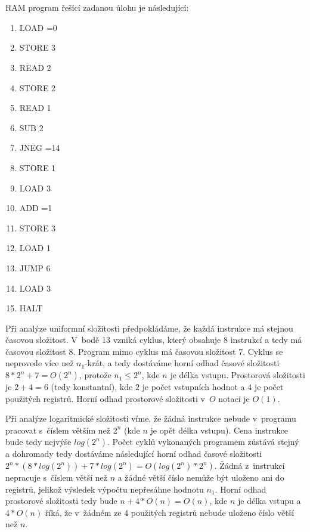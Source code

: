 \documentclass[a4paper]{article}
\begin{document}
\section*{}
RAM program řešící zadanou úlohu je následující:
\begin{enumerate}
    \item LOAD =0
    \item STORE 3
    \item READ 2
    \item STORE 2
    \item READ 1
    \item SUB 2
    \item JNEG =14
    \item STORE 1
    \item LOAD 3
    \item ADD =1
    \item STORE 3
    \item LOAD 1
    \item JUMP 6
    \item LOAD 3
    \item HALT
\end{enumerate}

Při analýze uniformní složitosti předpokládáme, že každá instrukce má stejnou časovou složitost.
V~bodě 13 vzniká cyklus, který obsahuje $8$ instrukcí a tedy má časovou složitost $8$. Program mimo cyklus má časovou složitost $7$.
Cyklus se neprovede více než $n_1$-krát, a tedy dostáváme horní odhad časové složitosti $8*2^n+7=O(2^{n})$,
protože $n_1 \leq 2^n$, kde $n$ je délka vstupu.
Prostorová složitosti je $2+4=6$ (tedy konstantní), kde $2$ je počet vstupních hodnot a $4$ je počet použitých registrů.
Horní odhad prostorové složitosti v~$O$ notaci je $O(1)$.

Při analýze logaritmické složitosti víme, že žádná instrukce nebude v~programu pracovat s~číslem větším než $2^n$
(kde $n$ je opět délka vstupu).
Cena instrukce bude tedy nejvýše $log(2^n)$.
Počet cyklů vykonaných programem zůstává stejný a dohromady tedy dostáváme následující horní odhad časové složitosti
$2^n*(8*log(2^n))+7*log(2^n)=O(log(2^n)*2^n)$.
Žádná z~instrukcí nepracuje s~číslem větší než $n$ a žádné větší číslo nemůže být uloženo ani do registrů, jelikož výsledek výpočtu
nepřesáhne hodnotu $n_1$. Horní odhad prostorové složitosti tedy bude $n+4*O(n)=O(n)$, kde $n$ je délka vstupu a $4*O(n)$ říká, že v~žádném
ze $4$ použitých registrů nebude uloženo číslo větší než $n$.
\end{document}
